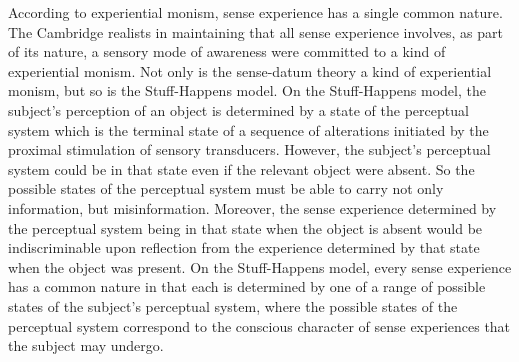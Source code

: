 \documentclass[12pt]{article}
\begin{document}
According to experiential monism, sense experience has a single common nature. The Cambridge realists in maintaining that all sense experience involves, as part of its nature, a sensory mode of awareness were committed to a kind of experiential monism. Not only is the sense-datum theory a kind of experiential monism, but so is the Stuff-Happens model. On the Stuff-Happens model, the subject's perception of an object is determined by a state of the perceptual system which is the terminal state of a sequence of alterations initiated by the proximal stimulation of sensory transducers. However, the subject's perceptual system could be in that state even if the relevant object were absent. So the possible states of the perceptual system must be able to carry not only information, but misinformation. Moreover, the sense experience determined by the perceptual system being in that state when the object is absent would be indiscriminable upon reflection from the experience determined by that state when the object was present. On the Stuff-Happens model, every sense experience has a common nature in that each is determined by one of a range of possible states of the subject's perceptual system, where the possible states of the perceptual system correspond to the conscious character of sense experiences that the subject may undergo.
\end{document}
